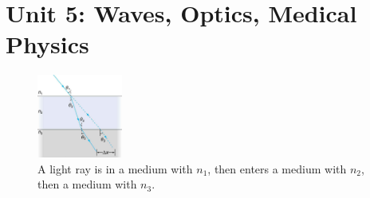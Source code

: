 \documentclass[12pt,twocolumn]{article}
\begin{document}
\section{Unit 5: Waves, Optics, Medical Physics}

\begin{figure}[ht]
\centering
\includegraphics[width=0.25\textwidth]{lens_1.jpeg}
\caption{\label{fig:lens_1} \small A light ray is in a medium with $n_1$, then enters a medium with $n_2$, then a medium with $n_3$.}
\end{figure}
\end{document}
